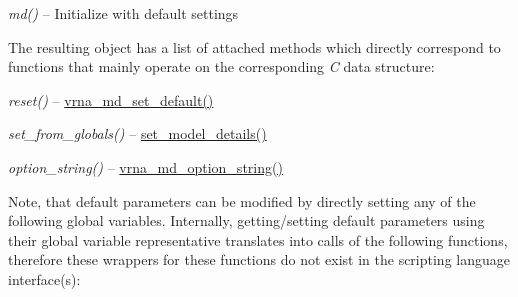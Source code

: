 \begin{DoxyRefList}
\begin{DoxyItemize}
\item {\itshape md()} -- Initialize with default settings
\end{DoxyItemize}

The resulting object has a list of attached methods which directly correspond to functions that mainly operate on the corresponding {\itshape C} data structure\+:~\newline

\begin{DoxyItemize}
\item {\itshape reset()} -- \hyperlink{group__model__details_ga8ac6ff84936282436f822644bf841f66}{vrna\+\_\+md\+\_\+set\+\_\+default()}
\item {\itshape set\+\_\+from\+\_\+globals()} -- \hyperlink{group__model__details_gabad896c3650d420f3f3ddefc69e2bceb}{set\+\_\+model\+\_\+details()}
\item {\itshape option\+\_\+string()} -- \hyperlink{group__model__details_ga3a7469f0725a849af6ba61a57dfd60ce}{vrna\+\_\+md\+\_\+option\+\_\+string()}
\end{DoxyItemize}

Note, that default parameters can be modified by directly setting any of the following global variables. Internally, getting/setting default parameters using their global variable representative translates into calls of the following functions, therefore these wrappers for these functions do not exist in the scripting language interface(s)\+:


\end{DoxyRefList}
